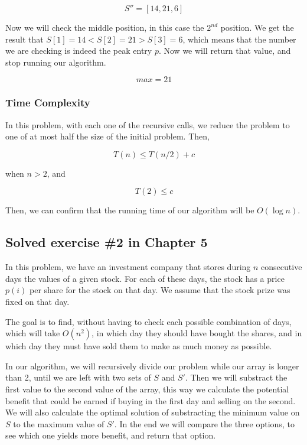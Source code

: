 \documentclass{article}
\begin{document}
$$S'' = [14,21,6]$$

Now we will check the middle position, in this case the $2^{nd}$ position. We get the result that $S[1] = 14<S[2] = 21>S[3] = 6$, which means that the number we are checking is indeed the peak entry $p$. Now we will return that value, and stop running our algorithm.

$$max = 21$$

\subsubsection*{Time Complexity}

In this problem, with each one of the recursive calls, we reduce the problem to one of at most half the size of the initial problem. Then,

$$T(n)\leq T(n/2) + c$$

when $n>2$, and

$$T(2)\leq c$$

Then, we can confirm that the running time of our algorithm will be $O(\log n)$.

\pagebreak

\subsection*{Solved exercise \#2 in Chapter 5}

In this problem, we have an investment company that stores during $n$ consecutive days the values of a given stock. For each of these days, the stock has a price $p(i)$ per share for the stock on that day. We assume that the stock prize was fixed on that day.

The goal is to find, without having to check each possible combination of days, which will take $O(n^2)$, in which day they should have bought the shares, and in which day they must have sold them to make as much money as possible.

In our algorithm, we will recursively divide our problem while our array is longer than 2, until we are left with two sets of $S$ and $S'$. Then we will substract the first value to the second value of the array, this way we calculate the potential benefit that could be earned if buying in the first day and selling on the second. We will also calculate the optimal solution of substracting the minimum value on $S$ to the maximum value of $S'$. In the end we will compare the three options, to see which one yields more benefit, and return that option.
\end{document}
